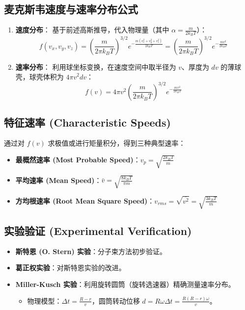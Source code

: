 \documentclass{article}
\begin{document}
\subsection{麦克斯韦速度与速率分布公式}
\begin{enumerate}
    \item \textbf{速度分布}：
    基于前述高斯推导，代入物理量（其中 $\alpha = \frac{m}{2k_B T}$）：
    \[ f(v_x, v_y, v_z) = \left( \frac{m}{2\pi k_B T} \right)^{3/2} e^{-\frac{m(v_x^2 + v_y^2 + v_z^2)}{2k_B T}} = \left( \frac{m}{2\pi k_B T} \right)^{3/2} e^{-\frac{mv^2}{2k_B T}} \]
    \item \textbf{速率分布}：
    利用球坐标变换，在速度空间中取半径为 $v$、厚度为 $dv$ 的薄球壳，球壳体积为 $4\pi v^2 dv$：
    \[ f(v) = 4\pi v^2 \left( \frac{m}{2\pi k_B T} \right)^{3/2} e^{-\frac{mv^2}{2k_B T}} \]
\end{enumerate}

\subsection{特征速率 (Characteristic Speeds)}
通过对 $f(v)$ 求极值或进行矩量积分，得到三种典型速率：
\begin{itemize}
    \item \textbf{最概然速率 (Most Probable Speed)}：$v_p = \sqrt{\frac{2k_B T}{m}}$
    \item \textbf{平均速率 (Mean Speed)}：$\bar{v} = \sqrt{\frac{8k_B T}{\pi m}}$
    \item \textbf{方均根速率 (Root Mean Square Speed)}：$v_{rms} = \sqrt{\overline{v^2}} = \sqrt{\frac{3k_B T}{m}}$
\end{itemize}

\subsection{实验验证 (Experimental Verification)}
\begin{itemize}
    \item \textbf{斯特恩 (O. Stern) 实验}：分子束方法初步验证。
    \item \textbf{葛正权实验}：对斯特恩实验的改进。
    \item \textbf{Miller-Kusch 实验}：利用旋转圆筒（旋转选速器）精确测量速率分布。
    \begin{itemize}
        \item 物理模型：$\Delta t = \frac{R-r}{v}$，圆筒转动位移 $d = R\omega \Delta t = \frac{R(R-r)\omega}{v}$。
    \end{itemize}
\end{itemize}
\end{document}
